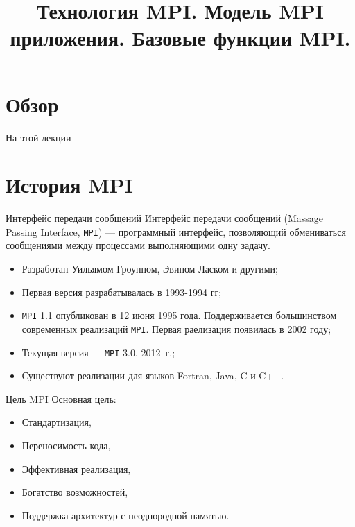 

\title{Технология MPI. Модель MPI приложения. Базовые функции MPI.}



\begin{frame}
\titlepage
\end{frame}

\section*{Обзор}

\begin{frame}{На этой лекции}
\tableofcontents
\end{frame}

\section{История MPI}

\begin{frame}{Интерфейс передачи сообщений}
Интерфейс передачи сообщений (\abbr Massage Passing Interface, \texttt{MPI}) --- программный интерфейс, позволяющий обмениваться сообщениями между процессами выполняющими одну задачу.
\vfill
\begin{itemize}
    \item Разработан Уильямом Гроуппом, Эвином Ласком и другими;
    \item Первая версия разрабатывалась в 1993-1994 гг;
    \item \texttt{MPI} 1.1 опубликован в 12 июня 1995 года. Поддерживается
    большинством современных реализаций \texttt{MPI}. Первая раелизация
    появилась в 2002 году;
    \item Текущая версия --- \texttt{MPI} 3.0. 2012~г.;
    \item Существуют реализации для языков Fortran, Java, C и C++.
\end{itemize}
\end{frame}

\begin{frame}{Цель MPI}
Основная цель:
\begin{itemize}
    \item Стандартизация,
    \item Переносимость кода,
    \item Эффективная реализация,
    \item Богатство возможностей,
    \item Поддержка архитектур с неоднородной памятью.
\end{itemize}
\end{frame}

